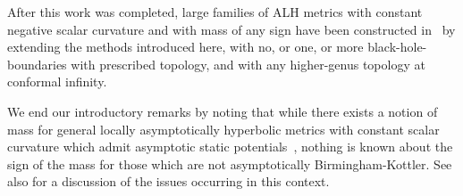 \documentclass[a4paper,10pt]{article}
\begin{document}
 After this work was completed,   large families of ALH metrics with constant negative scalar curvature and with mass of any sign   have been constructed in~\cite{ChDelayNegative} by extending the methods introduced here, with no, or one, or more  black-hole-boundaries with prescribed topology, and with any higher-genus topology at  conformal infinity.

 We end our introductory remarks by noting
  that while there exists a notion of mass for general locally asymptotically hyperbolic metrics with constant scalar curvature which admit asymptotic static potentials~\cite{deHaro:2000xn}, nothing is known about the sign of the mass for those which are not asymptotically Birmingham-Kottler.
  See also \cite{HerzlichMAH} for a discussion of the issues occurring in this context.
\end{document}
